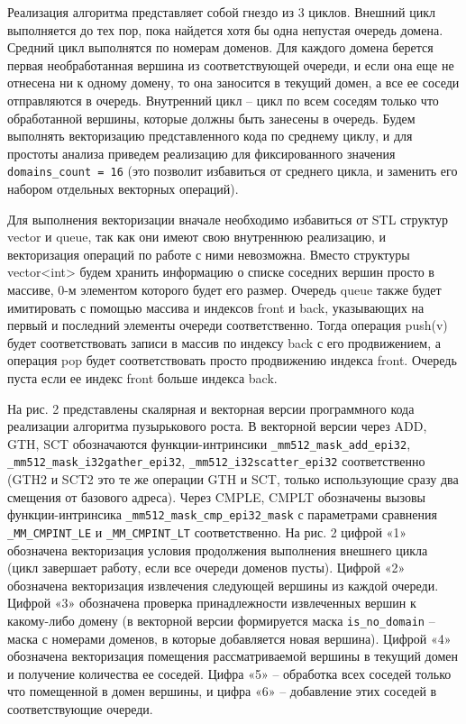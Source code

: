 \documentclass[
11pt,%
tightenlines,%
twoside,%
onecolumn,%
nofloats,%
nobibnotes,%
nofootinbib,%
superscriptaddress,%
noshowpacs,%
centertags]%
{revtex4}
\begin{document}
Реализация алгоритма представляет собой гнездо из 3 циклов.
Внешний цикл выполняется до тех пор, пока найдется хотя бы одна непустая очередь домена.
Средний цикл выполнятся по номерам доменов.
Для каждого домена берется первая необработанная вершина из соответствующей очереди, и если она еще не отнесена ни к одному домену, то она заносится в текущий домен, а все ее соседи отправляются в очередь.
Внутренний цикл -- цикл по всем соседям только что обработанной вершины, которые должны быть занесены в очередь.
Будем выполнять векторизацию представленного кода по среднему циклу, и для простоты анализа приведем реализацию для фиксированного значения \texttt{domains\_count = 16} (это позволит избавиться от среднего цикла, и заменить его набором отдельных векторных операций).

Для выполнения векторизации вначале необходимо избавиться от STL структур vector и queue, так как они имеют свою внутреннюю реализацию, и векторизация операций по работе с ними невозможна.
Вместо структуры vector<int> будем хранить информацию о списке соседних вершин просто в массиве, 0-м элементом которого будет его размер.
Очередь queue также будет имитировать с помощью массива и индексов front и back, указывающих на первый и последний элементы очереди соответственно.
Тогда операция push(v) будет соответствовать записи в массив по индексу back с его продвижением, а операция pop будет соответствовать просто продвижению индекса front.
Очередь пуста если ее индекс front больше индекса back.

На рис. 2 представлены скалярная и векторная версии программного кода реализации алгоритма пузырькового роста.
В векторной версии через ADD, GTH, SCT обозначаются функции-интринсики \texttt{\_mm512\_mask\_add\_epi32}, \texttt{\_mm512\_mask\_i32gather\_epi32}, \texttt{\_mm512\_i32scatter\_epi32} соответственно (GTH2 и SCT2 это те же операции GTH и SCT, только использующие сразу два смещения от базового адреса).
Через CMPLE, CMPLT обозначены вызовы функции-интринсика \texttt{\_mm512\_mask\_cmp\_epi32\_mask} с параметрами сравнения \texttt{\_MM\_CMPINT\_LE} и \texttt{\_MM\_CMPINT\_LT} соответственно.
На рис. 2 цифрой «1» обозначена векторизация условия продолжения выполнения внешнего цикла (цикл завершает работу, если все очереди доменов пусты).
Цифрой «2» обозначена векторизация извлечения следующей вершины из каждой очереди.
Цифрой «3» обозначена проверка принадлежности извлеченных вершин к какому-либо домену (в векторной версии формируется маска \texttt{is\_no\_domain} -- маска с номерами доменов, в которые добавляется новая вершина).
Цифрой «4» обозначена векторизация помещения рассматриваемой вершины в текущий домен и получение количества ее соседей.
Цифра «5» -- обработка всех соседей только что помещенной в домен вершины, и цифра «6» -- добавление этих соседей в соответствующие очереди.
\end{document}
